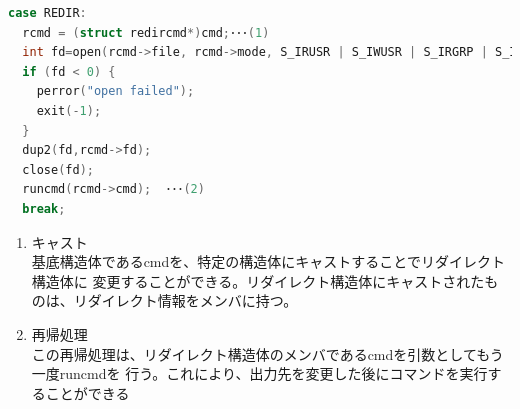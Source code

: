 \documentclass[a4j, twocolumn]{ltjsarticle}
\begin{document}
      \begin{lstlisting}[language=C,caption=runcmd一部抜粋]
case REDIR:
  rcmd = (struct redircmd*)cmd;･･･(1)
  int fd=open(rcmd->file, rcmd->mode, S_IRUSR | S_IWUSR | S_IRGRP | S_IROTH);
  if (fd < 0) {
    perror("open failed");
    exit(-1);
  }
  dup2(fd,rcmd->fd);
  close(fd);
  runcmd(rcmd->cmd);  ･･･(2)
  break;
      \end{lstlisting}
      \begin{enumerate}
        \item キャスト
        \\ \indent 基底構造体であるcmdを、特定の構造体にキャストすることでリダイレクト構造体に
        変更することができる。リダイレクト構造体にキャストされたものは、リダイレクト情報をメンバに持つ。
        \item 再帰処理
        \\ \indent この再帰処理は、リダイレクト構造体のメンバであるcmdを引数としてもう一度runcmdを
        行う。これにより、出力先を変更した後にコマンドを実行することができる
      \end{enumerate}
\end{document}
